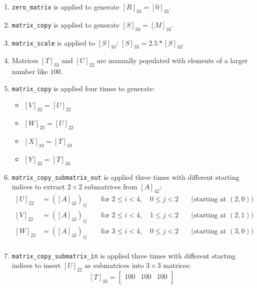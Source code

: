 \documentclass[11pt,fleqn]{report}
\begin{document}
\begin{enumerate}
        This simplification occurs only in the first test case, where $[B]_{33}$ 
        is the identity matrix, because it is the only matrix that is  
        both symmetric and a transformation matrix.

    \item \texttt{zero\_matrix} is applied to generate $[R]_{33} = [0]_{33}$.
    \item \texttt{matrix\_copy} is applied to generate $[S]_{33} = [M]_{33}$.
    \item \texttt{matrix\_scale} is applied to $[S]_{33}$: $[S]_{33} = 2.5 * [S]_{33}$.
    \item Matrices $[T]_{33}$ and $[U]_{22}$ are manually populated with elements 
        of a larger number like $100$.
    \item \texttt{matrix\_copy} is applied four times to generate:
            \begin{itemize}
                \item $[V]_{22} = [U]_{22}$
                \item $[W]_{22} = [U]_{22}$
                \item $[X]_{33} = [T]_{33}$
                \item $[Y]_{33} = [T]_{33}$
            \end{itemize}
        \item \texttt{matrix\_copy\_submatrix\_out} is applied three times with different starting indices to extract 
        $2 \times 2$ submatrices from $[A]_{42}$:
        \[
        \begin{aligned}
        [U]_{22} &= ([A]_{42})_{ij} \qquad \text{for } 2 \leqslant i < 4,\quad 0 \leqslant j < 2 \quad &\text{(starting at } (2,0)) \\
        [V]_{22} &= ([A]_{42})_{ij} \qquad \text{for } 2 \leqslant i < 4,\quad 1 \leqslant j < 2 \quad &\text{(starting at } (2,1)) \\
        [W]_{22} &= ([A]_{42})_{ij} \qquad \text{for } 3 \leqslant i < 4,\quad 0 \leqslant j < 2 \quad &\text{(starting at } (3,0)) \\
        \end{aligned}
        \]
    \item \texttt{matrix\_copy\_submatrix\_in} is applied three times with different starting indices to insert 
        $[U]_{22}$ as submatrices into $3 \times 3$ matrices:
        \[
        [T]_{33} = 
        \begin{bmatrix}
            100 & 100 & 100 \\

\end{bmatrix}\]
\end{enumerate}
\end{document}
